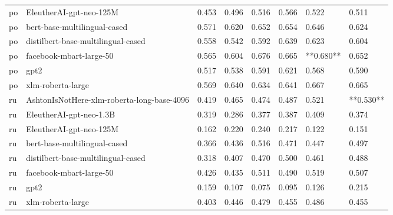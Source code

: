 \begin{tabular}{llllllll}
      po &                    EleutherAI-gpt-neo-125M & 0.453 &                     0.496 &                 0.516 &                  0.566 &                                   0.522 &     0.511 \\
      po &               bert-base-multilingual-cased & 0.571 &                     0.620 &                 0.652 &                  0.654 &                                   0.646 &     0.624 \\
      po &         distilbert-base-multilingual-cased & 0.558 &                     0.542 &                 0.592 &                  0.639 &                                   0.623 &     0.604 \\
      po &                    facebook-mbart-large-50 & 0.565 &                     0.604 &                 0.676 &                  0.665 &                               **0.680** &     0.652 \\
      po &                                       gpt2 & 0.517 &                     0.538 &                 0.591 &                  0.621 &                                   0.568 &     0.590 \\
      po &                          xlm-roberta-large & 0.569 &                     0.640 &                 0.634 &                  0.641 &                                   0.667 &     0.665 \\
      ru & AshtonIsNotHere-xlm-roberta-long-base-4096 & 0.419 &                     0.465 &                 0.474 &                  0.487 &                                   0.521 & **0.530** \\
      ru &                    EleutherAI-gpt-neo-1.3B & 0.319 &                     0.286 &                 0.377 &                  0.387 &                                   0.409 &     0.374 \\
      ru &                    EleutherAI-gpt-neo-125M & 0.162 &                     0.220 &                 0.240 &                  0.217 &                                   0.122 &     0.151 \\
      ru &               bert-base-multilingual-cased & 0.366 &                     0.436 &                 0.516 &                  0.471 &                                   0.447 &     0.497 \\
      ru &         distilbert-base-multilingual-cased & 0.318 &                     0.407 &                 0.470 &                  0.500 &                                   0.461 &     0.488 \\
      ru &                    facebook-mbart-large-50 & 0.426 &                     0.435 &                 0.511 &                  0.490 &                                   0.519 &     0.507 \\
      ru &                                       gpt2 & 0.159 &                     0.107 &                 0.075 &                  0.095 &                                   0.126 &     0.215 \\
      ru &                          xlm-roberta-large & 0.403 &                     0.446 &                 0.479 &                  0.455 &                                   0.486 &     0.455 \\
\bottomrule
\end{tabular}
